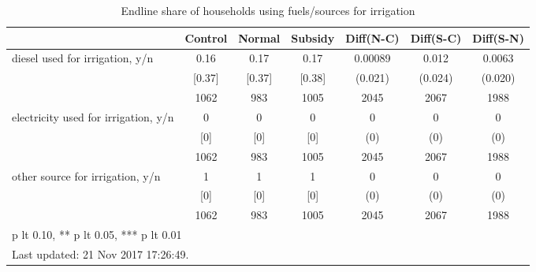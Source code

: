 \begin{table}[htbp]\centering
\def\sym#1{\ifmmode^{#1}\else\(^{#1}\)\fi}
\caption{Endline share of households using fuels/sources for irrigation \label{tab:"balance"}}
\begin{tabular*}{1\hsize}{@{\hskip\tabcolsep\extracolsep\fill}l*{1}{cccccc}}
\toprule
                                &  Control&   Normal&  Subsidy&Diff(N-C)         &Diff(S-C)         &Diff(S-N)         \\
\midrule
diesel used for irrigation, y/n &     0.16&     0.17&     0.17&  0.00089         &    0.012         &   0.0063         \\
                                &   [0.37]&   [0.37]&   [0.38]&  (0.021)         &  (0.024)         &  (0.020)         \\
                                &     1062&      983&     1005&     2045         &     2067         &     1988         \\
electricity used for irrigation, y/n&        0&        0&        0&        0         &        0         &        0         \\
                                &      [0]&      [0]&      [0]&      (0)         &      (0)         &      (0)         \\
                                &     1062&      983&     1005&     2045         &     2067         &     1988         \\
other source for irrigation, y/n&        1&        1&        1&        0         &        0         &        0         \\
                                &      [0]&      [0]&      [0]&      (0)         &      (0)         &      (0)         \\
                                &     1062&      983&     1005&     2045         &     2067         &     1988         \\
\bottomrule
\multicolumn{7}{l}{\footnotesize * p lt 0.10, ** p lt 0.05, *** p lt 0.01}\\
\multicolumn{7}{l}{\footnotesize Last updated: 21 Nov 2017 17:26:49.}\\
\end{tabular*}
\end{table}
